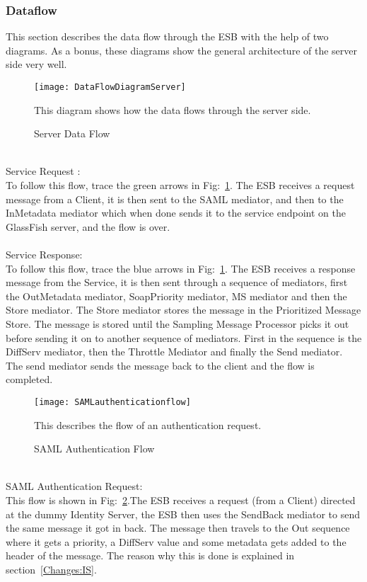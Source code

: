     \subsubsection{Dataflow}\label{Textual Server Dataflow} 
        This section describes the data flow through the ESB with the help of two diagrams. As a bonus, these diagrams show the general architecture of the server side very well.
\\
        \begin{figure}[h]
            \centering
            \texttt{[image: DataFlowDiagramServer]}
            \caption{Server Data Flow}
            This diagram shows how the data flows through the server side. 
            \label{fig:DataFlowDiagramServer}
        \end{figure}
\\
Service Request :\\
To follow this flow, trace the green arrows in Fig:~\ref{fig:DataFlowDiagramServer}. The ESB receives a request message from a Client, it is then sent to the SAML mediator, and then to the InMetadata mediator which when done sends it to the service endpoint on the GlassFish server, and the flow is over.
\\\\
Service Response:\\
To follow this flow, trace the blue arrows in Fig:~\ref{fig:DataFlowDiagramServer}. The ESB receives a response message from the Service, it is then sent through a sequence of mediators, first the OutMetadata mediator, SoapPriority mediator, MS mediator and then  the Store mediator. The Store mediator stores the message in the Prioritized Message Store. The message is stored until the Sampling Message Processor picks it out before sending it on to another sequence of mediators. First in the sequence is the DiffServ mediator, then the Throttle Mediator and finally the Send mediator. The send mediator sends the message back to the client and the flow is completed.
\\
    \begin{figure}[h]
        \centering
        \texttt{[image: SAMLauthenticationflow]}
        \caption{SAML Authentication Flow}
        This describes the flow of an authentication request. 
        \label{fig:SAMLauthenticationflow}
    \end{figure}
\\           
SAML Authentication Request:\\
This flow is shown in Fig:~\ref{fig:SAMLauthenticationflow}.The ESB receives a request (from a Client) directed at the dummy Identity Server, the ESB then uses the SendBack mediator to send the same message it got in back. The message then travels to the Out sequence where it gets a priority, a DiffServ value and some metadata gets added to the header of the message. The reason why this is done is explained in section~\ref{Changes:IS}.

